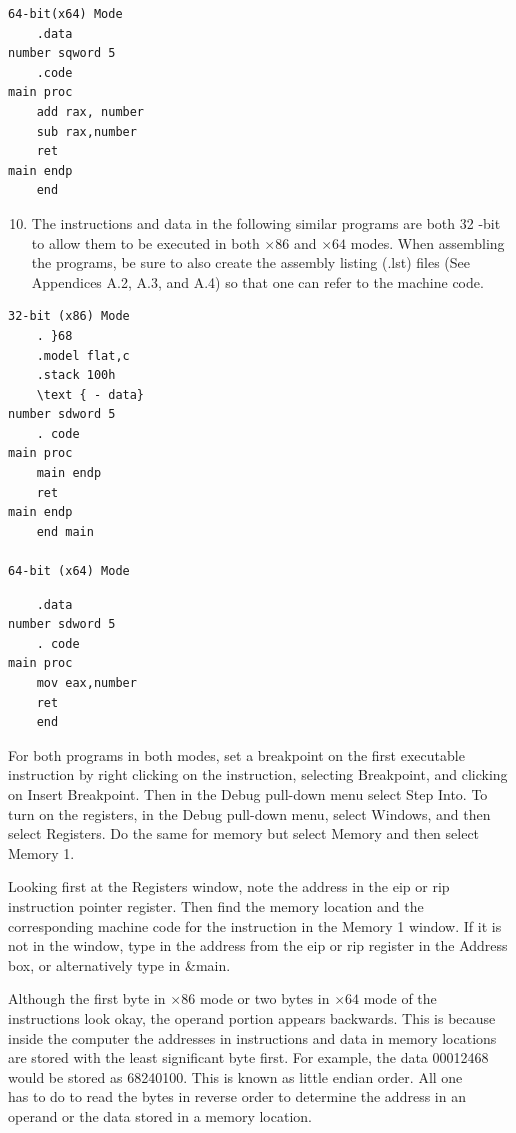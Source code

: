 \documentclass[10pt]{book}
\begin{document}
\begin{verbatim}
64-bit(x64) Mode
    .data
number sqword 5
    .code
main proc
    add rax, number
    sub rax,number
    ret
main endp
    end
\end{verbatim}

\begin{enumerate}
  \setcounter{enumi}{9}
  \item The instructions and data in the following similar programs are both 32 -bit to allow them to be executed in both $\times 86$ and $\times 64$ modes. When assembling the programs, be sure to also create the assembly listing (.lst) files (See Appendices A.2, A.3, and A.4) so that one can refer to the machine code.
\end{enumerate}


\begin{verbatim}
32-bit (x86) Mode
    . }68
    .model flat,c
    .stack 100h
    \text { - data}
number sdword 5
    . code
main proc
    main endp
    ret
main endp
    end main

64-bit (x64) Mode
\end{verbatim}

\begin{verbatim}
    .data
number sdword 5
    . code
main proc
    mov eax,number
    ret
    end
\end{verbatim}

For both programs in both modes, set a breakpoint on the first executable instruction by right clicking on the instruction, selecting Breakpoint, and clicking on Insert Breakpoint. Then in the Debug pull-down menu select Step Into. To turn on the registers, in the Debug pull-down menu, select Windows, and then select Registers. Do the same for memory but select Memory and then select Memory 1.

Looking first at the Registers window, note the address in the eip or rip instruction pointer register. Then find the memory location and the corresponding machine code for the instruction in the Memory 1 window. If it is not in the window, type in the address from the eip or rip register in the Address box, or alternatively type in \&main.

Although the first byte in $\times 86$ mode or two bytes in $\times 64$ mode of the instructions look okay, the operand portion appears backwards. This is because inside the computer the addresses in instructions and data in memory locations are stored with the least significant byte first. For example, the data 00012468 would be stored as 68240100. This is known as little endian order. All one\\
has to do to read the bytes in reverse order to determine the address in an operand or the data stored in a memory location.
\end{document}
